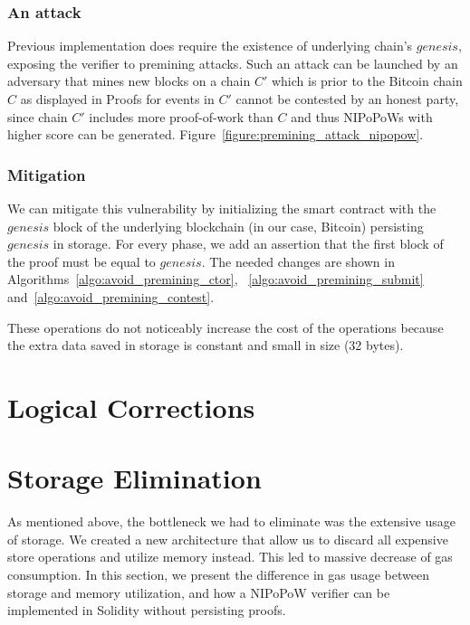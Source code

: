 \subsubsection{An attack} Previous implementation does require the existence of
underlying chain's $genesis$, exposing the verifier to premining attacks. Such
an attack can be launched by an adversary that mines new blocks on a chain $C'$
which is prior to the Bitcoin chain $C$ as displayed in
 Proofs for events in $C'$ cannot
be contested by an honest party, since chain $C'$ includes more proof-of-work
than $C$ and thus NIPoPoWs with higher score can be generated.
Figure~\ref{figure:premining_attack_nipopow}.

\subsubsection{Mitigation}

We can mitigate this vulnerability by initializing the smart contract with the
$genesis$ block of the underlying blockchain (in our case, Bitcoin) persisting
$genesis$ in storage. For every phase, we add an assertion that the first block
of the proof must be equal to $genesis$. The needed changes are shown in
Algorithms~\ref{algo:avoid_premining_ctor}, ~\ref{algo:avoid_premining_submit}
and~\ref{algo:avoid_premining_contest}.

These operations do not noticeably increase the cost of the operations because
the extra data saved in storage is constant and small in size (32 bytes).



\section{Logical Corrections}


\section{Storage Elimination}

As mentioned above, the bottleneck we had to eliminate was the extensive usage
of storage. We created a new architecture that allow us to discard all
expensive store operations and utilize memory instead. This led to massive
decrease of gas consumption. In this section, we present the difference in gas
usage between storage and memory utilization, and how a NIPoPoW verifier can be
implemented in Solidity without persisting proofs.

